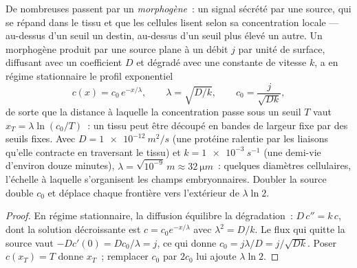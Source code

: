 \begin{theorem}\label{thm:b2:vertebrate-development:gradient}
De nombreuses  passent par un \emph{morphogène}~: un signal
sécrété par une source, qui se répand dans le tissu et que les cellules
lisent selon sa concentration locale --- au-dessus d'un seuil un destin,
au-dessus d'un seuil plus élevé un autre. Un morphogène produit par une
source plane à un débit $j$ par unité de surface, diffusant avec un
coefficient $D$ et dégradé avec une constante de vitesse $k$, a en
régime stationnaire le profil exponentiel
\[
c(x) = c_0\,e^{-x/\lambda}, \qquad \lambda = \sqrt{D/k}, \qquad c_0 = \frac{j}{\sqrt{Dk}},
\]
de sorte que la distance à laquelle la concentration passe sous un
seuil $T$ vaut $x_T = \lambda\ln(c_0/T)$~: un tissu peut être découpé en
bandes de largeur fixe par des seuils fixes. Avec $D =
\qty{1e-12}{m^2/s}$ (une protéine ralentie par les liaisons qu'elle
contracte en traversant le tissu) et $k = \qty{1e-3}{s^{-1}}$ (une
demi-vie d'environ douze minutes), $\lambda = \sqrt{10^{-9}}\,\unit{m} \approx
\qty{32}{\micro m}$~: quelques diamètres cellulaires,
l'échelle à laquelle s'organisent les champs embryonnaires. Doubler la
source double $c_0$ et déplace chaque frontière vers l'extérieur de $\lambda
\ln 2$.
\end{theorem}
\begin{proof}
En régime stationnaire, la diffusion équilibre la dégradation~:
$D\,c'' = k\,c$, dont la solution décroissante est
$c = c_0 e^{-x/\lambda}$ avec $\lambda^2 =
D/k$. Le flux qui quitte la source vaut $-Dc'(0) = Dc_0/\lambda = j$,
ce qui donne $c_0 = j\lambda/D = j/\sqrt{Dk}$. Poser $c(x_T) = T$ donne
$x_T$~; remplacer $c_0$ par $2c_0$ lui ajoute $\lambda\ln 2$.
\end{proof}

